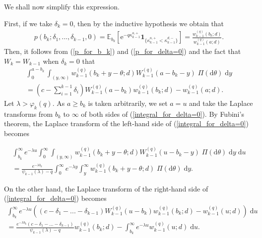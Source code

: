 \documentclass[12pt,reqno]{amsart}
\newcommand{\blue}{\textcolor[rgb]{0.00,0.00,1.00}}
\newcommand{\green}{\textcolor[rgb]{0.00,0.70,.30}}
\theoremstyle{definition}
\theoremstyle{remark}
\newcommand{\e}{\mathbb{E}}
\newcommand{\ind}{\mathbf{1}}
\newcommand{\wq}{w^{(q)}}
\begin{document}
We shall now simplify this expression.

First, if we take $\delta_k=0$, then by the inductive  hypothesis we obtain that
\begin{eqnarray}\label{p_for_delta=0}
p(b_k;\delta_1,...,\delta_{k-1},0)=\e_{b_k} \left[ \mathrm{e}^{-q \kappa_{k-1}^{a,+}} \ind_{\{\kappa_{k-1}^{a,+}< \kappa_{k-1}^{d,-}\}} \right]=\frac{\wq_{k-1}(b_k;d)}{\wq_{k-1}(a;d)}.
\end{eqnarray}
Then, it follows from (\ref{p_for_b_k}) and (\ref{p_for_delta=0}) and the fact that $W_k = W_{k-1}$ when $\delta_k = 0$ that
\begin{multline}\label{integral_for_delta=0}
\int_{0}^{a-b_k}\int_{(y,\infty)} \wq_{k-1}(b_k+y-\theta;d) W_{k-1}^{(q)}(a-b_k-y)\;\Pi(\textrm{d}\theta)\;\textrm{d}y\\
=\left(c-\sum_{i=1}^{k-1} \delta_i\right)W_{k-1}^{(q)}(a-b_k)\wq_{k-1}(b_k;d)-\wq_{k-1}(a;d).
\end{multline}
Let $\lambda > \varphi_{k}(q) $.
As $a\geq b_k$ is taken arbitrarily, we set $a=u$ and take the Laplace transforms from $b_k$ to $\infty$ of both sides of (\ref{integral_for_delta=0}). 
By Fubini's theorem, the Laplace transform of the left-hand side of (\ref{integral_for_delta=0}) becomes

\begin{multline} \label{eqn_kazu_referenced}
\int_{b_k}^{\infty}e^{-\lambda u}\int_{0}^{\infty}\int_{(y,\infty)} \wq_{k-1}(b_k+y-\theta;d) W_{k-1}^{(q)}(u-b_k-y)\;\Pi(\textrm{d}\theta) \;\textrm{d}y\;\textrm{d}u\\=
\frac{e^{-\lambda b_k}}{\psi_{k-1}(\lambda)-q} 
\int_{0}^{\infty} e^{-\lambda y} \int_{y}^{\infty} \wq_{k-1}(b_k+y-\theta;d) \;\Pi(\textrm{d}\theta) \;\textrm{d}y.
\end{multline}

On the other hand, the Laplace transform of the right-hand side of (\ref{integral_for_delta=0}) becomes
\begin{multline*} 
\int_{b_k}^{\infty}e^{-\lambda u} \left((c-\delta_1-...-\delta_{k-1})W_{k-1}^{(q)}(u-b_k)\wq_{k-1}(b_k;d)-\wq_{k-1}(u;d)\right)\;\textrm{d}u\\=
\frac{e^{-\lambda b_k}(c-\delta_1-...-\delta_{k-1})}{\psi_{k-1}(\lambda)-q}\wq_{k-1}(b_k;d)-\int_{b_k}^{\infty} e^{-\lambda u} \wq_{k-1}(u;d) 
\;\textrm{d}u.
\end{multline*}
\end{document}
